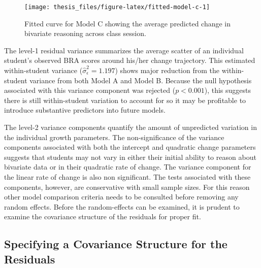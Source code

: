 \documentclass[11pt]{umnthesis}
\begin{document}
\begin{figure}[H]

{\centering \texttt{[image: thesis\_files/figure-latex/fitted-model-c-1]} 

}

\caption[Fitted curve for Model C showing the average predicted change in bivariate reasoning across class session]{Fitted curve for Model C showing the average predicted change in bivariate reasoning across class session.}\label{fig:fitted-model-c}
\end{figure}

The level-1 residual variance summarizes the average scatter of an individual student's observed BRA scores around his/her change trajectory. This estimated within-student variance (\(\hat\sigma^2_{\epsilon}=1.197\)) shows major reduction from the within-student variance from both Model A and Model B. Because the null hypothesis associated with this variance component was rejected (\(p<0.001\)), this suggests there is still within-student variation to account for so it may be profitable to introduce substantive predictors into future models.

The level-2 variance components quantify the amount of unpredicted variation in the individual growth parameters. The non-significance of the variance components associated with both the intercept and quadratic change parameters suggests that students may not vary in either their initial ability to reason about bivariate data or in their quadratic rate of change. The variance component for the linear rate of change is also non significant. The tests associated with these components, however, are conservative with small sample sizes. For this reason other model comparison criteria needs to be consulted before removing any random effects. Before the random-effects can be examined, it is prudent to examine the covariance structure of the residuals for proper fit.

\hypertarget{specifying-a-covariance-structure-for-the-residuals}{%
\subsection{Specifying a Covariance Structure for the Residuals}\label{specifying-a-covariance-structure-for-the-residuals}}
\end{document}
